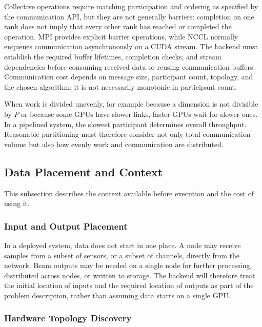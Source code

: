 Collective operations require matching participation and ordering as specified by the communication API, but they are not generally barriers: completion on one rank does not imply that every other rank has reached or completed the operation. MPI provides explicit barrier operations, while NCCL normally enqueues communication asynchronously on a CUDA stream. The backend must establish the required buffer lifetimes, completion checks, and stream dependencies before consuming received data or reusing communication buffers. Communication cost depends on message size, participant count, topology, and the chosen algorithm; it is not necessarily monotonic in participant count.

When work is divided unevenly, for example because a dimension is not divisible by $P$ or because some GPUs have slower links, faster GPUs wait for slower ones. In a pipelined system, the slowest participant determines overall throughput. Reasonable partitioning must therefore consider not only total communication volume but also how evenly work and communication are distributed.

\subsection{Data Placement and Context}
\label{sec:data-placement-and-context}

This subsection describes the context available before execution and the cost of using it.

\subsubsection{Input and Output Placement}
\label{sec:input-and-output-placement}

In a deployed system, data does not start in one place. A node may receive samples from a subset of sensors, or a subset of channels, directly from the network. Beam outputs may be needed on a single node for further processing, distributed across nodes, or written to storage. The backend will therefore treat the initial location of inputs and the required location of outputs as part of the problem description, rather than assuming data starts on a single GPU.

\subsubsection{Hardware Topology Discovery}
\label{sec:hardware-topology-discovery}

